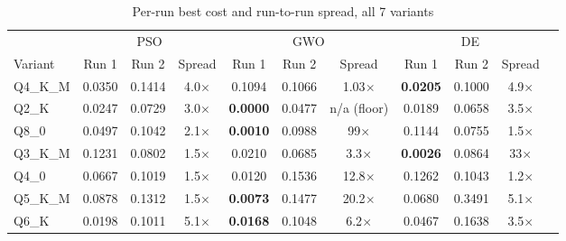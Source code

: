 \documentclass[journal]{IEEEtran}
\begin{document}
\begin{table}[t]
\caption{Per-run best cost and run-to-run spread, all 7 variants}
\label{tab:phase2-robustness-summary}
\centering
\footnotesize
\begin{tabular}{@{}lcccccccccc@{}}
\toprule
& \multicolumn{3}{c}{PSO} & \multicolumn{3}{c}{GWO} & \multicolumn{3}{c}{DE} \\
\cmidrule(lr){2-4}\cmidrule(lr){5-7}\cmidrule(lr){8-10}
Variant & Run 1 & Run 2 & Spread & Run 1 & Run 2 & Spread & Run 1 & Run 2 & Spread \\
\midrule
Q4\_K\_M & 0.0350 & 0.1414 & 4.0$\times$ & 0.1094 & 0.1066 & 1.03$\times$ & \textbf{0.0205} & 0.1000 & 4.9$\times$ \\
Q2\_K    & 0.0247 & 0.0729 & 3.0$\times$ & \textbf{0.0000} & 0.0477 & n/a (floor) & 0.0189 & 0.0658 & 3.5$\times$ \\
Q8\_0    & 0.0497 & 0.1042 & 2.1$\times$ & \textbf{0.0010} & 0.0988 & 99$\times$ & 0.1144 & 0.0755 & 1.5$\times$ \\
Q3\_K\_M & 0.1231 & 0.0802 & 1.5$\times$ & 0.0210 & 0.0685 & 3.3$\times$ & \textbf{0.0026} & 0.0864 & 33$\times$ \\
Q4\_0    & 0.0667 & 0.1019 & 1.5$\times$ & 0.0120 & 0.1536 & 12.8$\times$ & 0.1262 & 0.1043 & 1.2$\times$ \\
Q5\_K\_M & 0.0878 & 0.1312 & 1.5$\times$ & \textbf{0.0073} & 0.1477 & 20.2$\times$ & 0.0680 & 0.3491 & 5.1$\times$ \\
Q6\_K    & 0.0198 & 0.1011 & 5.1$\times$ & \textbf{0.0168} & 0.1048 & 6.2$\times$ & 0.0467 & 0.1638 & 3.5$\times$ \\
\bottomrule
\end{tabular}
\end{table}
\end{document}
